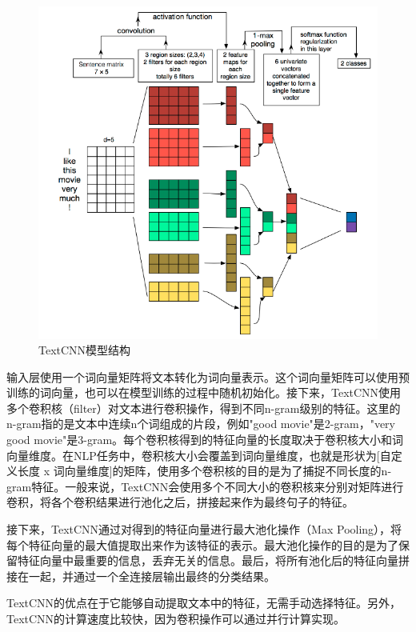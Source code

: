 \documentclass{report}
\begin{document}
	\begin{figure}[htbp]
		\centering
		\includegraphics[width=1.\textwidth]{fig/TextCNN.png}
		\caption{TextCNN模型结构}
		\label{fig:TextCNN}
	\end{figure}
	
	输入层使用一个词向量矩阵将文本转化为词向量表示。这个词向量矩阵可以使用预训练的词向量，也可以在模型训练的过程中随机初始化。接下来，TextCNN使用多个卷积核（filter）对文本进行卷积操作，得到不同n-gram级别的特征。这里的n-gram指的是文本中连续n个词组成的片段，例如"good movie"是2-gram，"very good movie"是3-gram。每个卷积核得到的特征向量的长度取决于卷积核大小和词向量维度。在NLP任务中，卷积核大小会覆盖到词向量维度，也就是形状为[自定义长度 x 词向量维度]的矩阵，使用多个卷积核的目的是为了捕捉不同长度的n-gram特征。一般来说，TextCNN会使用多个不同大小的卷积核来分别对矩阵进行卷积，将各个卷积结果进行池化之后，拼接起来作为最终句子的特征。
	
	接下来，TextCNN通过对得到的特征向量进行最大池化操作（Max Pooling），将每个特征向量的最大值提取出来作为该特征的表示。最大池化操作的目的是为了保留特征向量中最重要的信息，丢弃无关的信息。最后，将所有池化后的特征向量拼接在一起，并通过一个全连接层输出最终的分类结果。
	
	TextCNN的优点在于它能够自动提取文本中的特征，无需手动选择特征。另外，TextCNN的计算速度比较快，因为卷积操作可以通过并行计算实现。
	
\end{document}
